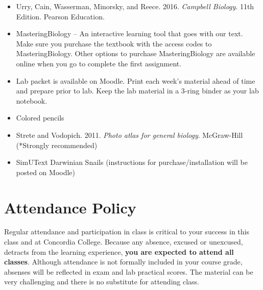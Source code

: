\documentclass{tufte-handout}
\begin{document}
\begin{fullwidth}
\begin{itemize}
	\item Urry, Cain, Wasserman, Minorsky, and Reece. 2016. \emph{Campbell Biology}. 11th Edition. Pearson Education.
	\item MasteringBiology -- An interactive learning tool that goes with our text. Make sure you purchase the textbook with the access codes to MasteringBiology. Other options to purchase MasteringBiology are available online when you go to complete the first assignment.
	\item Lab packet is available on Moodle. Print each week's material ahead of time and prepare prior to lab. Keep the lab material in a 3-ring binder as your lab notebook. 
	\item Colored pencils
	\item Strete and Vodopich. 2011. \emph{Photo atlas for general biology}. McGraw-Hill (*Strongly recommended)
	\item SimUText Darwinian Snails (instructions for purchase/installation will be posted on Moodle)
\end{itemize}

\section{Attendance Policy}

Regular attendance and participation in class is critical to your success in this class and at Concordia College. Because any absence, excused or unexcused, detracts from the learning experience, \textbf{you are expected to attend all classes}. Although attendance is not formally included in your course grade, absenses will be reflected in exam and lab practical scores. The material can be very challenging and there is no substitute for attending class. 





\end{fullwidth}
\end{document}
